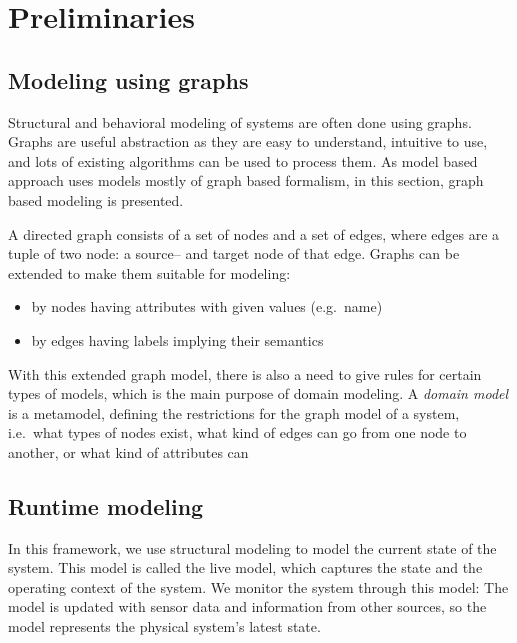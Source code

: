 
\chapter{Preliminaries}


\section{Modeling using graphs}

Structural and behavioral modeling of systems are often done using graphs. 
Graphs are useful abstraction as they are easy to understand, intuitive to use, and lots of existing algorithms can be used to process them. 
As model based approach uses models mostly of graph based formalism, in this section, graph based modeling is presented.

A directed graph consists of a set of nodes and a set of edges, where edges are a tuple of two node: a source-- and target node of that edge. 
Graphs can be extended to make them suitable for modeling:

\begin{itemize}
	\item by nodes having attributes with given values (e.g.\ name)
	\item by edges having labels implying their semantics
\end{itemize}

With this extended graph model, there is also a need to give rules for certain types of models, which is the main purpose of domain modeling.
A \emph{domain model} is a metamodel, defining the restrictions for the graph model of a system, i.e.\ what types of nodes exist, what kind of edges can go from one node to another, or what kind of attributes can

\section{Runtime modeling}

In this framework, we use structural modeling to model the current state of the system. This model is called the live model, which captures the state and the operating context of the system. We monitor the system through this model: The model is updated with sensor data and information from other sources, so the model represents the physical system's latest state. 


